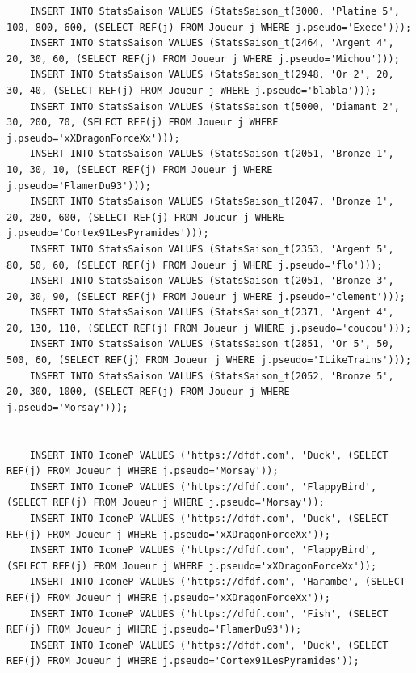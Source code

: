 \documentclass[a4paper,10pt]{report}
\begin{document}
\begin{lstlisting}
    INSERT INTO StatsSaison VALUES (StatsSaison_t(3000, 'Platine 5', 100, 800, 600, (SELECT REF(j) FROM Joueur j WHERE j.pseudo='Exece')));
    INSERT INTO StatsSaison VALUES (StatsSaison_t(2464, 'Argent 4', 20, 30, 60, (SELECT REF(j) FROM Joueur j WHERE j.pseudo='Michou')));
    INSERT INTO StatsSaison VALUES (StatsSaison_t(2948, 'Or 2', 20, 30, 40, (SELECT REF(j) FROM Joueur j WHERE j.pseudo='blabla')));
    INSERT INTO StatsSaison VALUES (StatsSaison_t(5000, 'Diamant 2', 30, 200, 70, (SELECT REF(j) FROM Joueur j WHERE j.pseudo='xXDragonForceXx')));
    INSERT INTO StatsSaison VALUES (StatsSaison_t(2051, 'Bronze 1', 10, 30, 10, (SELECT REF(j) FROM Joueur j WHERE j.pseudo='FlamerDu93')));
    INSERT INTO StatsSaison VALUES (StatsSaison_t(2047, 'Bronze 1', 20, 280, 600, (SELECT REF(j) FROM Joueur j WHERE j.pseudo='Cortex91LesPyramides')));
    INSERT INTO StatsSaison VALUES (StatsSaison_t(2353, 'Argent 5', 80, 50, 60, (SELECT REF(j) FROM Joueur j WHERE j.pseudo='flo')));
    INSERT INTO StatsSaison VALUES (StatsSaison_t(2051, 'Bronze 3', 20, 30, 90, (SELECT REF(j) FROM Joueur j WHERE j.pseudo='clement')));
    INSERT INTO StatsSaison VALUES (StatsSaison_t(2371, 'Argent 4', 20, 130, 110, (SELECT REF(j) FROM Joueur j WHERE j.pseudo='coucou')));
    INSERT INTO StatsSaison VALUES (StatsSaison_t(2851, 'Or 5', 50, 500, 60, (SELECT REF(j) FROM Joueur j WHERE j.pseudo='ILikeTrains')));
    INSERT INTO StatsSaison VALUES (StatsSaison_t(2052, 'Bronze 5', 20, 300, 1000, (SELECT REF(j) FROM Joueur j WHERE j.pseudo='Morsay')));


    INSERT INTO IconeP VALUES ('https://dfdf.com', 'Duck', (SELECT REF(j) FROM Joueur j WHERE j.pseudo='Morsay'));
    INSERT INTO IconeP VALUES ('https://dfdf.com', 'FlappyBird', (SELECT REF(j) FROM Joueur j WHERE j.pseudo='Morsay'));
    INSERT INTO IconeP VALUES ('https://dfdf.com', 'Duck', (SELECT REF(j) FROM Joueur j WHERE j.pseudo='xXDragonForceXx'));
    INSERT INTO IconeP VALUES ('https://dfdf.com', 'FlappyBird', (SELECT REF(j) FROM Joueur j WHERE j.pseudo='xXDragonForceXx'));
    INSERT INTO IconeP VALUES ('https://dfdf.com', 'Harambe', (SELECT REF(j) FROM Joueur j WHERE j.pseudo='xXDragonForceXx'));
    INSERT INTO IconeP VALUES ('https://dfdf.com', 'Fish', (SELECT REF(j) FROM Joueur j WHERE j.pseudo='FlamerDu93'));
    INSERT INTO IconeP VALUES ('https://dfdf.com', 'Duck', (SELECT REF(j) FROM Joueur j WHERE j.pseudo='Cortex91LesPyramides'));



\end{lstlisting}
\end{document}
